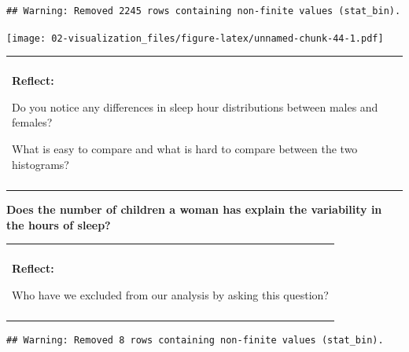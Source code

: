 \documentclass[
]{book}
\newenvironment{Shaded}{\begin{snugshade}}{\end{snugshade}}
\newcommand{\DataTypeTok}[1]{\textcolor[rgb]{0.13,0.29,0.53}{#1}}
\newcommand{\DecValTok}[1]{\textcolor[rgb]{0.00,0.00,0.81}{#1}}
\newcommand{\KeywordTok}[1]{\textcolor[rgb]{0.13,0.29,0.53}{\textbf{#1}}}
\newcommand{\NormalTok}[1]{#1}
\newcommand{\OperatorTok}[1]{\textcolor[rgb]{0.81,0.36,0.00}{\textbf{#1}}}
\newcommand{\StringTok}[1]{\textcolor[rgb]{0.31,0.60,0.02}{#1}}
\newenvironment{reflect}
{
    \begin{center}
    
    \begin{tabular}{|p{0.8\textwidth}|}
    \rowcolor{LightBlue}
    \hline\\
    \rowcolor{LightBlue}
    \textbf{Reflect:}
}
{
    \\\rowcolor{LightBlue}
    \\\hline
    \end{tabular} 
    \end{center}
}
\begin{document}
\begin{verbatim}
## Warning: Removed 2245 rows containing non-finite values (stat_bin).
\end{verbatim}

\texttt{[image: 02-visualization\_files/figure-latex/unnamed-chunk-44-1.pdf]}

\begin{reflect}
Do you notice any differences in sleep hour distributions between males
and females?

What is easy to compare and what is hard to compare between the two
histograms?
\end{reflect}

\textbf{Does the number of children a woman has explain the variability in the hours of sleep?}

\begin{reflect}
Who have we excluded from our analysis by asking this question?
\end{reflect}

\begin{Shaded}
\end{Shaded}

\begin{verbatim}
## Warning: Removed 8 rows containing non-finite values (stat_bin).
\end{verbatim}
\end{document}
